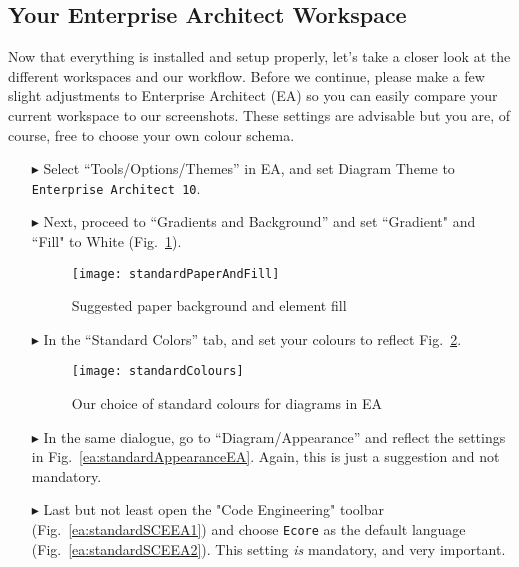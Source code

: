 \visHeader

\subsection{Your Enterprise Architect Workspace}

Now\hypertarget{projectStructure vis}{} that everything is installed and setup properly, let's take a closer look at the different workspaces and our workflow.
Before we continue, please make a few slight adjustments to Enterprise Architect (EA) so you can easily compare your current workspace to our screenshots.
These settings are advisable but you are, of course, free to choose your own colour schema.

\begin{itemize}

\item[$\blacktriangleright$] Select ``Tools/Options/Themes'' in EA, and set Diagram Theme to \texttt{Enterprise Architect 10}.

\item[$\blacktriangleright$] Next, proceed to ``Gradients and Background'' and set ``Gradient" and ``Fill" to White (Fig.~\ref{ea:paperAndElementFill}). 
\vspace{0.5cm}

\begin{figure}[htbp]
    \centering
    \texttt{[image: standardPaperAndFill]}
    \caption{Suggested paper background and element fill}
    \label{ea:paperAndElementFill}
\end{figure}

\vspace{0.5cm}

\item[$\blacktriangleright$] In the ``Standard Colors'' tab, and set your colours to reflect Fig.~\ref{ea:standardColoursEA}.

\vspace{0.5cm}

\begin{figure}[htbp]
  \centering
  \texttt{[image: standardColours]}
  \caption{Our choice of standard colours for diagrams in EA}
  \label{ea:standardColoursEA}
\end{figure}

\vspace{0.5cm}

\item[$\blacktriangleright$] In the same dialogue, go to ``Diagram/Appearance'' and reflect the settings in Fig.~\ref{ea:standardAppearanceEA}.
Again, this is just a suggestion and not mandatory.

\vspace{0.5cm}

\item[$\blacktriangleright$] Last but not least open the "Code Engineering" toolbar (Fig.~\ref{ea:standardSCEEA1}) and choose \texttt{Ecore} as the default language (Fig.~\ref{ea:standardSCEEA2}). This setting \emph{is} mandatory, and very important.
\end{itemize}

